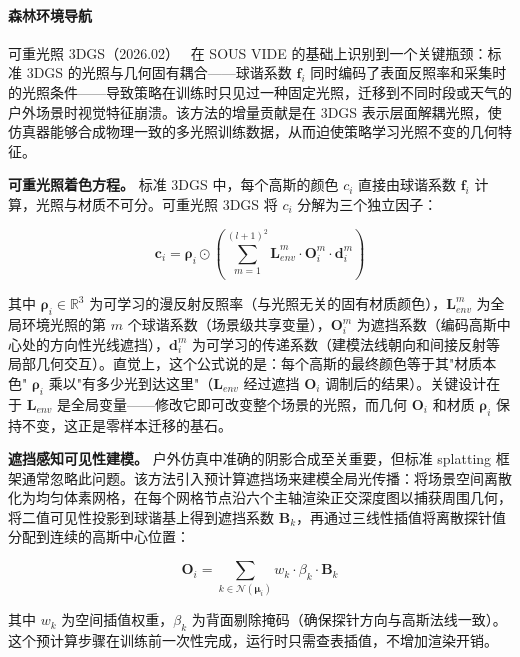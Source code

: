 \paragraph{森林环境导航}

可重光照 3DGS（2026.02）~\cite{2602_07101} 在 SOUS VIDE 的基础上识别到一个关键瓶颈：标准 3DGS 的光照与几何固有耦合——球谐系数 $\mathbf{f}_i$ 同时编码了表面反照率和采集时的光照条件——导致策略在训练时只见过一种固定光照，迁移到不同时段或天气的户外场景时视觉特征崩溃。该方法的增量贡献是在 3DGS 表示层面解耦光照，使仿真器能够合成物理一致的多光照训练数据，从而迫使策略学习光照不变的几何特征。

\textbf{可重光照着色方程。}
标准 3DGS 中，每个高斯的颜色 $c_i$ 直接由球谐系数 $\mathbf{f}_i$ 计算，光照与材质不可分。可重光照 3DGS 将 $c_i$ 分解为三个独立因子：

\begin{equation}
\mathbf{c}_i = \boldsymbol{\rho}_i \odot \left(\sum_{m=1}^{(l+1)^2} \mathbf{L}_{env}^{m} \cdot \mathbf{O}_i^{m} \cdot \mathbf{d}_i^{m}\right)
\end{equation}

其中 $\boldsymbol{\rho}_i \in \mathbb{R}^3$ 为可学习的漫反射反照率（与光照无关的固有材质颜色），$\mathbf{L}_{env}^{m}$ 为全局环境光照的第 $m$ 个球谐系数（场景级共享变量），$\mathbf{O}_i^{m}$ 为遮挡系数（编码高斯中心处的方向性光线遮挡），$\mathbf{d}_i^{m}$ 为可学习的传递系数（建模法线朝向和间接反射等局部几何交互）。直觉上，这个公式说的是：每个高斯的最终颜色等于其"材质本色" $\boldsymbol{\rho}_i$ 乘以"有多少光到达这里"（$\mathbf{L}_{env}$ 经过遮挡 $\mathbf{O}_i$ 调制后的结果）。关键设计在于 $\mathbf{L}_{env}$ 是全局变量——修改它即可改变整个场景的光照，而几何 $\mathbf{O}_i$ 和材质 $\boldsymbol{\rho}_i$ 保持不变，这正是零样本迁移的基石。

\textbf{遮挡感知可见性建模。}
户外仿真中准确的阴影合成至关重要，但标准 splatting 框架通常忽略此问题。该方法引入预计算遮挡场来建模全局光传播：将场景空间离散化为均匀体素网格，在每个网格节点沿六个主轴渲染正交深度图以捕获周围几何，将二值可见性投影到球谐基上得到遮挡系数 $\mathbf{B}_k$，再通过三线性插值将离散探针值分配到连续的高斯中心位置：

\begin{equation}
\mathbf{O}_i = \sum_{k \in \mathcal{N}(\boldsymbol{\mu}_i)} w_k \cdot \beta_k \cdot \mathbf{B}_k
\end{equation}

其中 $w_k$ 为空间插值权重，$\beta_k$ 为背面剔除掩码（确保探针方向与高斯法线一致）。这个预计算步骤在训练前一次性完成，运行时只需查表插值，不增加渲染开销。

